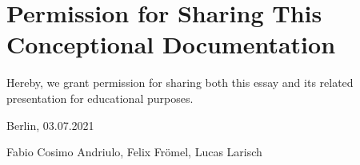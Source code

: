 \section*{Permission for Sharing This Conceptional Documentation}

Hereby, we grant permission for sharing both this essay and its related presentation for educational purposes.

\vspace{15mm}

{\setlength{\parindent}{0cm}
Berlin, 03.07.2021

Fabio Cosimo Andriulo,
    Felix Frömel,
    Lucas Larisch
}

